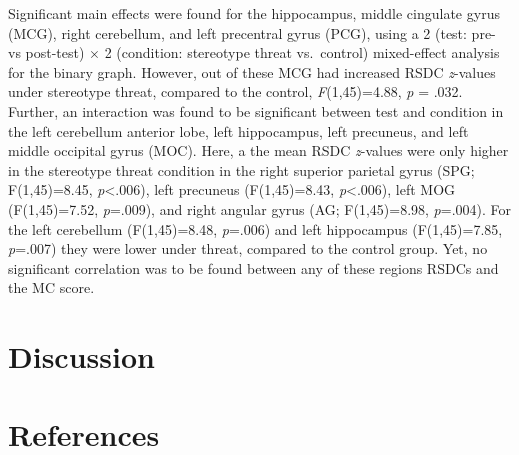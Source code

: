 \documentclass[
  stu]{apa7}
\begin{document}
Significant main effects were found for the hippocampus, middle cingulate gyrus (MCG), right cerebellum, and left precentral gyrus (PCG), using a 2 (test: pre- vs post-test) \(\times\) 2 (condition: stereotype threat vs.~control) mixed-effect analysis for the binary graph.
However, out of these MCG had increased RSDC \emph{z}-values under stereotype threat, compared to the control, \emph{F}(1,45)=4.88, \emph{p} = .032.
Further, an interaction was found to be significant between test and condition in the left cerebellum anterior lobe, left hippocampus, left precuneus, and left middle occipital gyrus (MOC).
Here, a the mean RSDC \emph{z}-values were only higher in the stereotype threat condition in the right superior parietal gyrus (SPG; F(1,45)=8.45, \emph{p}\textless.006), left precuneus (F(1,45)=8.43, \emph{p}\textless.006), left MOG (F(1,45)=7.52, \emph{p}=.009), and right angular gyrus (AG; F(1,45)=8.98, \emph{p}=.004).
For the left cerebellum (F(1,45)=8.48, \emph{p}=.006) and left hippocampus (F(1,45)=7.85, \emph{p}=.007) they were lower under threat, compared to the control group.
Yet, no significant correlation was to be found between any of these regions RSDCs and the MC score.

\section{Discussion}\label{discussion}

\newpage

\section{References}\label{references}
\end{document}
